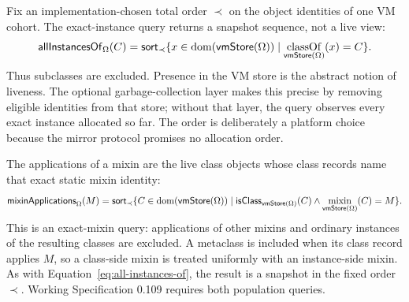 Fix an implementation-chosen total order $\prec$ on the object identities of
one VM cohort.  The exact-instance query returns a snapshot sequence, not a
live view:
\begin{equation}\label{eq:all-instances-of}
 \mathsf{allInstancesOf}_{\Omega}(C)=
 \mathsf{sort}_{\prec}
 \{x\in\mathop{\mathrm{dom}}(\mathsf{vmStore}(\Omega))
       \mid \mathop{\mathrm{classOf}}_{\mathsf{vmStore}(\Omega)}(x)=C\}.
\end{equation}
Thus subclasses are excluded.  Presence in the VM store is the abstract
notion of liveness.  The optional garbage-collection layer makes this precise
by removing eligible identities from that store; without that layer, the query
observes every exact instance allocated so far.  The order is deliberately a
platform choice because the mirror protocol promises no allocation order.

The applications of a mixin are the live class objects whose class records
name that exact static mixin identity:
\begin{equation}\label{eq:mixin-applications}
 \mathsf{mixinApplications}_{\Omega}(M)=
 \mathsf{sort}_{\prec}
 \{C\in\mathop{\mathrm{dom}}(\mathsf{vmStore}(\Omega))
       \mid \mathsf{isClass}_{\mathsf{vmStore}(\Omega)}(C)
       \land \mathop{\mathrm{mixin}}_{\mathsf{vmStore}(\Omega)}(C)=M\}.
\end{equation}
This is an exact-mixin query: applications of other mixins and ordinary
instances of the resulting classes are excluded.  A metaclass is included
when its class record applies $M$, so a class-side mixin is treated uniformly
with an instance-side mixin.  As with Equation~\eqref{eq:all-instances-of}, the
result is a snapshot in the fixed order $\prec$.  Working Specification 0.109
requires both population queries.

